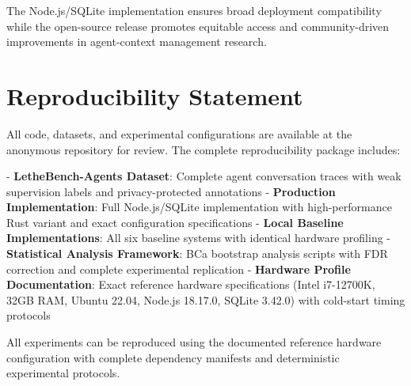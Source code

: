 \documentclass[letterpaper]{article}
\begin{document}
The Node.js/SQLite implementation ensures broad deployment compatibility while the open-source release promotes equitable access and community-driven improvements in agent-context management research.

\section*{Reproducibility Statement}

All code, datasets, and experimental configurations are available at the anonymous repository for review. The complete reproducibility package includes:

- \textbf{LetheBench-Agents Dataset}: Complete agent conversation traces with weak supervision labels and privacy-protected annotations
- \textbf{Production Implementation}: Full Node.js/SQLite implementation with high-performance Rust variant and exact configuration specifications
- \textbf{Local Baseline Implementations}: All six baseline systems with identical hardware profiling
- \textbf{Statistical Analysis Framework}: BCa bootstrap analysis scripts with FDR correction and complete experimental replication
- \textbf{Hardware Profile Documentation}: Exact reference hardware specifications (Intel i7-12700K, 32GB RAM, Ubuntu 22.04, Node.js 18.17.0, SQLite 3.42.0) with cold-start timing protocols

All experiments can be reproduced using the documented reference hardware configuration with complete dependency manifests and deterministic experimental protocols.
\end{document}
